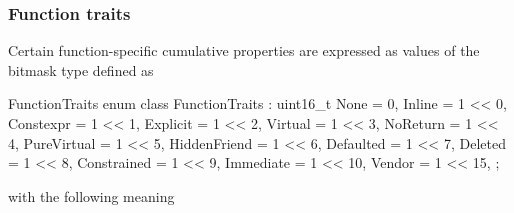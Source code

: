 
\subsubsection{Function traits}
\label{sec:ifc-function-traits}

Certain function-specific cumulative properties are expressed as values of the bitmask type  defined as
%
\begin{typedef}{FunctionTraits}{}
	enum class FunctionTraits : uint16_t {
		None			= 0,
		Inline			= 1 << 0,
		Constexpr		= 1 << 1,
		Explicit		= 1 << 2,
		Virtual			= 1 << 3,
		NoReturn		= 1 << 4,
		PureVirtual	= 1 << 5,
		HiddenFriend	= 1 << 6,
		Defaulted		= 1 << 7,
		Deleted		= 1 << 8,
		Constrained   = 1 << 9,
		Immediate = 1 << 10,
		Vendor			= 1 << 15,
	};
\end{typedef}
%
with the following meaning
